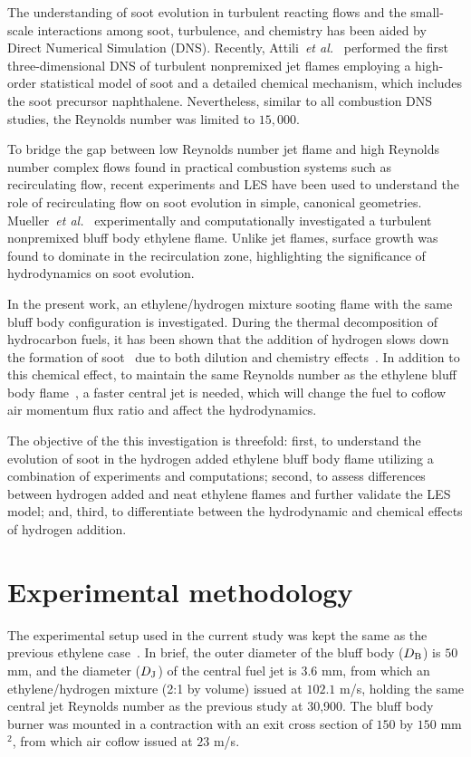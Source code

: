 \documentclass{essci}
\begin{document}
The understanding of soot evolution in turbulent reacting flows and the small-scale interactions among soot, turbulence, and chemistry has been aided by Direct Numerical Simulation (DNS).  Recently, Attili~\emph{et al.}~\cite{attili14} performed the first three-dimensional DNS of turbulent nonpremixed jet flames employing a high-order statistical model of soot and a detailed chemical mechanism, which includes the soot precursor naphthalene.  Nevertheless, similar to all combustion DNS studies, the Reynolds number was limited to $15,000$.

To bridge the gap between low Reynolds number jet flame and high Reynolds number complex flows found in practical combustion systems such as recirculating flow, recent experiments and LES have been used to understand the role of recirculating flow on soot evolution in simple, canonical geometries.  Mueller~\emph{et al.}~\cite{mueller13} experimentally and computationally investigated a turbulent nonpremixed bluff body ethylene flame.  Unlike jet flames, surface growth was found to dominate in the recirculation zone, highlighting the significance of hydrodynamics on soot evolution.

In the present work, an ethylene/hydrogen mixture sooting flame with the same bluff body configuration is investigated.  During the thermal decomposition of hydrocarbon fuels, it has been shown that the addition of hydrogen slows down the formation of soot~\cite{tesner58} due to both dilution and chemistry effects~\cite{dearden68,du95,gulder96,guo06,zhao14}.  In addition to this chemical effect, to maintain the same Reynolds number as the ethylene bluff body flame~\cite{mueller13}, a faster central jet is needed, which will change the fuel to coflow air momentum flux ratio and affect the hydrodynamics.

The objective of the this investigation is threefold: first, to understand the evolution of soot in the hydrogen added ethylene bluff body flame utilizing a combination of experiments and computations; second, to assess differences between hydrogen added and neat ethylene flames and further validate the LES model; and, third, to differentiate between the hydrodynamic and chemical effects of hydrogen addition.

\section{Experimental methodology}

The experimental setup used in the current study was kept the same as the previous ethylene case~\cite{mueller13}.  In brief, the outer diameter of the bluff body ($D_{\rm B}$) is $50$ mm, and the diameter ($D_{\rm J}$) of the central fuel jet is $3.6$ mm, from which an ethylene/hydrogen mixture (2:1 by volume) issued at $102.1$ m/s, holding the same central jet Reynolds number as the previous study at 30,900.  The bluff body burner was mounted in a contraction with an exit cross section of $150$ by $150$ mm$^2$, from which air coflow issued at $23$ m/s.  
\end{document}
